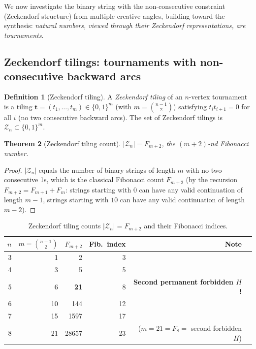 \documentclass[12pt,reqno]{amsart}
\newtheorem{theorem}{Theorem}[section]
\theoremstyle{definition}
\newtheorem{definition}[theorem]{Definition}
\theoremstyle{plain}
\begin{document}
We now investigate the binary string with the non-consecutive constraint
(Zeckendorf structure) from multiple creative angles, building toward the
synthesis: \emph{natural numbers, viewed through their Zeckendorf
representations, are tournaments}.

\subsection{Zeckendorf tilings: tournaments with non-consecutive backward arcs}
\label{ssec:zeck-tilings}

\begin{definition}[Zeckendorf tiling]
A \emph{Zeckendorf tiling} of an $n$-vertex tournament is a tiling
$\mathbf{t}=(t_1,\ldots,t_m)\in\{0,1\}^m$ (with $m=\binom{n-1}{2}$)
satisfying $t_i t_{i+1}=0$ for all $i$ (no two consecutive backward arcs).
The set of Zeckendorf tilings is $\mathcal{Z}_n\subset\{0,1\}^m$.
\end{definition}

\begin{theorem}[Zeckendorf tiling count]\label{thm:zeck-count}
$|\mathcal{Z}_n|=F_{m+2}$, the $(m+2)$-nd Fibonacci number.
\end{theorem}

\begin{proof}
$|\mathcal{Z}_n|$ equals the number of binary strings of length $m$
with no two consecutive 1s, which is the classical Fibonacci count
$F_{m+2}$ (by the recursion $F_{m+2}=F_{m+1}+F_m$: strings starting
with $0$ can have any valid continuation of length $m-1$, strings starting
with $10$ can have any valid continuation of length $m-2$).
\end{proof}

\begin{table}[ht]
\centering
\caption{Zeckendorf tiling counts $|\mathcal{Z}_n|=F_{m+2}$ and their Fibonacci indices.}
\begin{tabular}{rrrrrl}
\toprule
$n$ & $m=\binom{n-1}{2}$ & $F_{m+2}$ & Fib.\ index & Note\\
\midrule
3 & 1 & 2   & 3 & \\
4 & 3 & 5   & 5 & \\
5 & 6 & \textbf{21}  & 8 & \textbf{Second permanent forbidden $H$!}\\
6 & 10& 144 & 12 & \\
7 & 15& 1597& 17 & \\
8 & 21& 28657&23& ($m=21=F_8=$ second forbidden $H$)\\
\bottomrule
\end{tabular}
\end{table}
\end{document}

